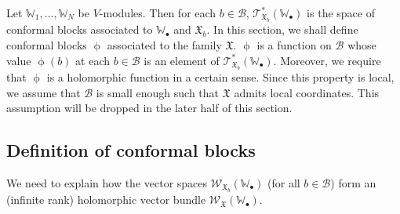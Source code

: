 \documentclass[12pt,a4paper,notitlepage]{article}
\theoremstyle{definition}
\theoremstyle{plain}
\newcommand{\fk}{\mathfrak}
\newcommand{\mc}{\mathcal}
\newcommand{\scr}{\mathscr}
\newcommand{\blt}{\bullet}
\newcommand{\Wbb}{\mathbb W}
\numberwithin{equation}{section}
\begin{document}
Let $\Wbb_1,\dots,\Wbb_N$ be $V$-modules. Then for each $b\in\mc B$, $\scr T_{\fk X_b}^*(\Wbb_\blt)$ is the space of conformal blocks associated to $\Wbb_\blt$ and $\fk X_b$. In this section, we shall define conformal blocks $\upphi$ associated to the family $\fk X$. $\upphi$ is a function on $\mc B$ whose value $\upphi(b)$ at each $b\in\mc B$ is an element of $\scr T_{\fk X_b}^*(\Wbb_\blt)$. Moreover, we require that $\upphi$ is a holomorphic function in a certain sense. Since this property is local, we  assume  that $\mc B$ is small enough such that $\fk X$ admits local coordinates. This assumption will be dropped in the later half of this section.



\subsection*{Definition of conformal blocks}

We need to explain how the vector spaces $\scr W_{\fk X_b}(\Wbb_\blt)$ (for all $b\in\mc B$) form an (infinite rank) holomorphic vector bundle $\scr W_{\fk X}(\Wbb_\blt)$.
\end{document}
